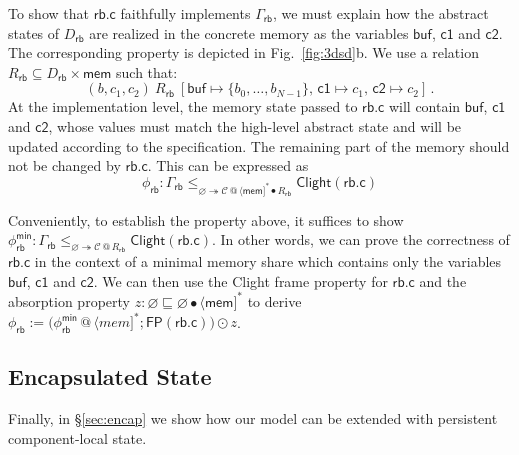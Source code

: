 \documentclass[acmsmall,screen,review,anonymous]{acmart}
\newcommand{\kw}[1]{\ensuremath{ \mathsf{#1} }}
\begin{document}

\begin{example} %
To show that $\kw{rb.c}$
faithfully implements $\Gamma_\kw{rb}$,
we must explain how the abstract states of $D_\kw{rb}$
are realized in the concrete memory
as the variables $\kw{buf}$, $\kw{c1}$ and $\kw{c2}$.
The corresponding property is depicted in Fig.~\ref{fig:3dsd}b.
We
use a relation $R_\kw{rb} \subseteq D_\kw{rb} \times \kw{mem}$
such that:
\[
  (b, c_1, c_2) \: \mathrel{R_\kw{rb}} \:
  [\kw{buf} \mapsto \{b_0, \ldots, b_{N-1}\}, \,
   \kw{c1} \mapsto c_1, \,
   \kw{c2} \mapsto c_2]
  \,.
\]
At the implementation level,
the memory state passed to $\kw{rb.c}$
will contain $\kw{buf}$, $\kw{c1}$ and $\kw{c2}$,
whose values must match the high-level abstract state
and will be updated according to the specification.
The remaining part of the memory should not be changed by $\kw{rb.c}$.
This can be expressed as
\begin{equation} \label{eqn:rbcorrect}
  \phi_\kw{rb} :
  \Gamma_\kw{rb}
  \le_{\varnothing \twoheadrightarrow
       \mathcal{C} \mathbin@
       \langle \kw{mem} ]^* \bullet R_\kw{rb}}
  \kw{Clight}(\kw{rb.c})
\end{equation}

Conveniently,
to establish the property above,
it suffices to show
$\phi_\kw{rb}^\kw{min} :
  \Gamma_\kw{rb}
  \le_{\varnothing \twoheadrightarrow \mathcal{C} \mathbin@ R_\kw{rb}}
  \kw{Clight}(\kw{rb.c})
$.
In other words,
we can prove the correctness of $\kw{rb.c}$
in the context of a minimal memory share
which contains only the variables $\kw{buf}$, $\kw{c1}$ and $\kw{c2}$.
We can then use the Clight frame property for $\kw{rb.c}$
and the absorption property
$z : \varnothing \sqsubseteq \varnothing \bullet \langle\kw{mem}]^*$
to derive
$
  \phi_\kw{rb} :=
  \big(
    \phi_\kw{rb}^\kw{min} \mathbin@ \langle mem ]^*
    \mathbin;
    \kw{FP}(\kw{rb.c})
  \big) \odot z
$.
\end{example}

\subsection{Encapsulated State} \label{sec:overview:encap} %

Finally,
in \S\ref{sec:encap}
we show how our model can be extended
with persistent component-local state.
\end{document}
